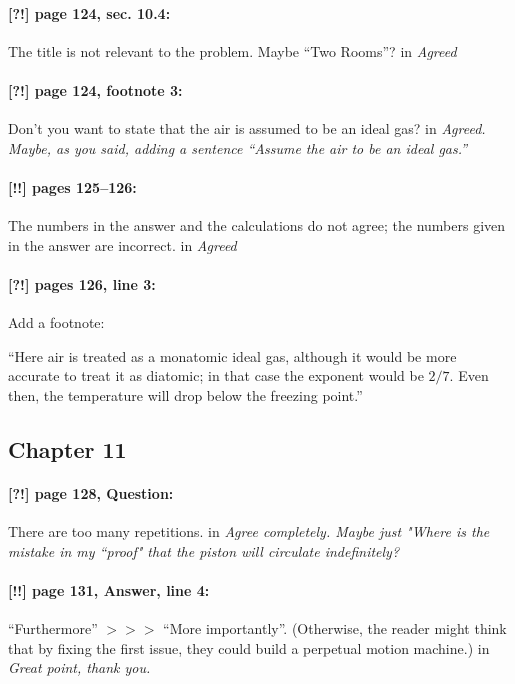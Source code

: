 \documentclass[twoside]{article}
\begin{document}
\paragraph{[?!] page 124, sec. 10.4:} The title is not relevant to the problem. Maybe ``Two Rooms''?
 in {\it  Agreed} 

\paragraph{[?!] page 124, footnote 3:} Don’t you want to state that the air is assumed to be an ideal gas?
 in {\it  Agreed. Maybe, as you said, adding a sentence ``Assume the air to be an ideal gas.''}

\paragraph{[!!] pages 125--126:} The numbers in the answer and the calculations do not agree; the numbers given in the answer are incorrect.
 in {\it  Agreed} 

\paragraph{[?!] pages 126, line 3:} Add a footnote:

``Here air is treated as a monatomic ideal gas, although it would be more accurate to treat it as diatomic; in that case the exponent would be $2/7$. Even then, the temperature will drop below the freezing point.''

\subsection*{Chapter 11}

\paragraph{[?!] page 128, Question:} There are too many repetitions.
 in {\it  Agree completely. Maybe just "Where is the mistake in my ``proof" that the piston will circulate indefinitely? } 

\paragraph{[!!] page 131, Answer, line 4:} ``Furthermore'' $>\!>\!>$ ``More importantly''. (Otherwise, the reader might think that by fixing the first issue, they could build a perpetual motion machine.)
 in {\it  Great point, thank you.}
\end{document}
